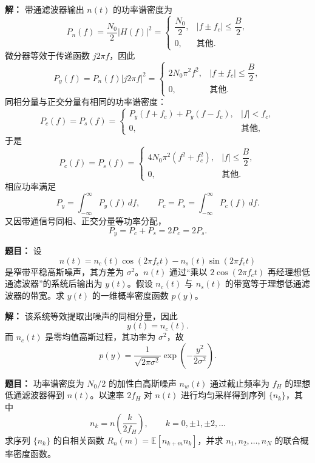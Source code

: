 \par\textbf{解：}
带通滤波器输出 $n(t)$ 的功率谱密度为
\[
P_n(f)=\frac{N_0}{2}|H(f)|^2=
\begin{cases}
\dfrac{N_0}{2},& |f\pm f_c|\le \dfrac{B}{2},\\[6pt]
0,& \text{其他}.
\end{cases}
\]
微分器等效于传递函数 $j2\pi f$，因此
\[
P_y(f)=P_n(f)|j2\pi f|^2=
\begin{cases}
2N_0\pi^2f^2,& |f\pm f_c|\le \dfrac{B}{2},\\[6pt]
0,& \text{其他}.
\end{cases}
\]
同相分量与正交分量有相同的功率谱密度：
\[
P_c(f)=P_s(f)=
\begin{cases}
P_y(f+f_c)+P_y(f-f_c),& |f|<f_c,\\
0,& \text{其他},
\end{cases}
\]
于是
\[
P_c(f)=P_s(f)=
\begin{cases}
4N_0\pi^2(f^2+f_c^2),& |f|\le \dfrac{B}{2},\\[6pt]
0,& \text{其他}.
\end{cases}
\]
相应功率满足
\[
P_y=\int_{-\infty}^{\infty}P_y(f)\,df,\qquad
P_c=P_s=\int_{-\infty}^{\infty}P_c(f)\,df.
\]
又因带通信号同相、正交分量等功率分配，
\[
P_y=P_c+P_s=2P_c=2P_s.
\]

\medskip
{}
\textbf{题目：}
设
\[
n(t)=n_c(t)\cos(2\pi f_ct)-n_s(t)\sin(2\pi f_ct)
\]
是窄带平稳高斯噪声，其方差为 $\sigma^2$。$n(t)$ 通过“乘以 $2\cos(2\pi f_ct)$ 再经理想低通滤波器”的系统后输出为 $y(t)$。假设 $n_c(t)$ 与 $n_s(t)$ 的带宽等于理想低通滤波器的带宽。求 $y(t)$ 的一维概率密度函数 $p(y)$。

\par\textbf{解：}
该系统等效提取出噪声的同相分量，因此
\[
y(t)=n_c(t).
\]
而 $n_c(t)$ 是零均值高斯过程，其功率为 $\sigma^2$，故
\[
p(y)=\frac{1}{\sqrt{2\pi\sigma^2}}\exp\!\left(-\frac{y^2}{2\sigma^2}\right).
\]

\medskip
{}
\textbf{题目：}
功率谱密度为 $N_0/2$ 的加性白高斯噪声 $n_w(t)$ 通过截止频率为 $f_H$ 的理想低通滤波器得到 $n(t)$。以速率 $2f_H$ 对 $n(t)$ 进行均匀采样得到序列 $\{n_k\}$，其中
\[
n_k=n\!\left(\frac{k}{2f_H}\right),\qquad k=0,\pm1,\pm2,\dots
\]
求序列 $\{n_k\}$ 的自相关函数 $R_n(m)=\mathbb{E}[n_{k+m}n_k]$，并求 $n_1,n_2,\dots,n_N$ 的联合概率密度函数。

